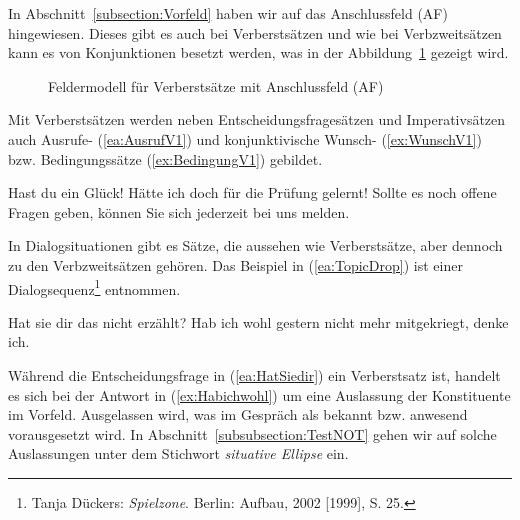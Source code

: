 In Abschnitt~\ref{subsection:Vorfeld} haben wir auf das Anschlussfeld (AF) hingewiesen. Dieses gibt es auch bei Verberstsätzen und wie bei Verbzweitsätzen kann es von Konjunktionen besetzt werden, was in der Abbildung~\ref{fig:VerberstfeldermitAF} gezeigt wird.

\begin{figure}[!htbp]
  \centering
  \caption{Feldermodell für Verberstsätze mit Anschlussfeld (AF)}
  \label{fig:VerberstfeldermitAF}
\end{figure}

Mit Verberstsätzen werden neben Entscheidungsfragesätzen und Imperativsätzen auch Ausrufe- (\ref{ea:AusrufV1}) und konjunktivische Wunsch- (\ref{ex:WunschV1}) bzw. Bedingungssätze (\ref{ex:BedingungV1}) gebildet.

\ea \label{ea:weitererSatzartenV1}
\ea \label{ea:AusrufV1} Hast du ein Glück!
\ex \label{ex:WunschV1} Hätte ich doch für die Prüfung gelernt!
\ex \label{ex:BedingungV1} Sollte es noch offene Fragen geben, können Sie sich jederzeit bei uns melden.
\z 
\z 

In Dialogsituationen gibt es Sätze, die aussehen wie Verberstsätze, aber dennoch zu den Verbzweitsätzen gehören. Das Beispiel in (\ref{ea:TopicDrop}) ist einer Dialogsequenz\footnote{Tanja Dückers: \textit{Spielzone}. Berlin: Aufbau, 2002 [1999], S. 25.} entnommen. 

\ea \label{ea:TopicDrop} 
\ea \label{ea:HatSiedir} Hat sie dir das nicht erzählt?
\ex \label{ex:Habichwohl} Hab ich wohl gestern nicht mehr mitgekriegt, denke ich.
\z 
\z 

Während die Entscheidungsfrage in (\ref{ea:HatSiedir}) ein Verberstsatz ist, handelt es sich bei der Antwort in (\ref{ex:Habichwohl}) um eine Auslassung der Konstituente im Vorfeld. Ausgelassen wird, was im Gespräch als bekannt bzw. anwesend vorausgesetzt wird. In Abschnitt~\ref{subsubsection:TestNOT} gehen wir auf solche Auslassungen unter dem Stichwort \textit{situative Ellipse} ein.


